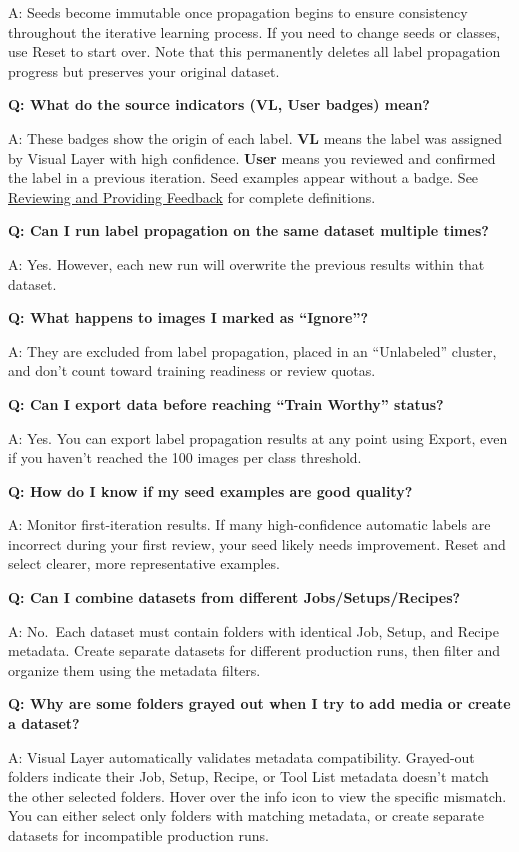 \documentclass[
  11pt,
  a4paper,
  11pt,
  oneside]{report}
\begin{document}
A: Seeds become immutable once propagation begins to ensure consistency
throughout the iterative learning process. If you need to change seeds
or classes, use Reset to start over. Note that this permanently deletes
all label propagation progress but preserves your original dataset.

\textbf{Q: What do the source indicators (VL, User badges) mean?}

A: These badges show the origin of each label. \textbf{VL} means the
label was assigned by Visual Layer with high confidence. \textbf{User}
means you reviewed and confirmed the label in a previous iteration. Seed
examples appear without a badge. See
\hyperref[reviewing-and-providing-feedback]{Reviewing and Providing
Feedback} for complete definitions.

\textbf{Q: Can I run label propagation on the same dataset multiple
times?}

A: Yes. However, each new run will overwrite the previous results within
that dataset.

\textbf{Q: What happens to images I marked as ``Ignore''?}

A: They are excluded from label propagation, placed in an ``Unlabeled''
cluster, and don't count toward training readiness or review quotas.

\textbf{Q: Can I export data before reaching ``Train Worthy'' status?}

A: Yes. You can export label propagation results at any point using
Export, even if you haven't reached the 100 images per class threshold.

\textbf{Q: How do I know if my seed examples are good quality?}

A: Monitor first-iteration results. If many high-confidence automatic
labels are incorrect during your first review, your seed likely needs
improvement. Reset and select clearer, more representative examples.

\textbf{Q: Can I combine datasets from different Jobs/Setups/Recipes?}

A: No.~Each dataset must contain folders with identical Job, Setup, and
Recipe metadata. Create separate datasets for different production runs,
then filter and organize them using the metadata filters.

\textbf{Q: Why are some folders grayed out when I try to add media or
create a dataset?}

A: Visual Layer automatically validates metadata compatibility.
Grayed-out folders indicate their Job, Setup, Recipe, or Tool List
metadata doesn't match the other selected folders. Hover over the info
icon to view the specific mismatch. You can either select only folders
with matching metadata, or create separate datasets for incompatible
production runs.
\end{document}
